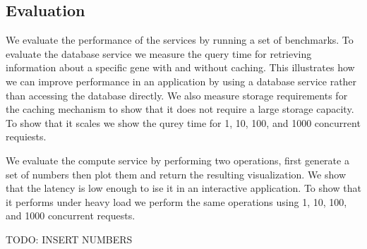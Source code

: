 \subsection*{Evaluation} 
We evaluate the performance of the services by running a set of benchmarks. To
evaluate the database service we measure the query time for retrieving
information about a specific gene with and without caching. This illustrates how
we can improve performance in an application by using a database service rather
than accessing the database directly. We also measure storage requirements for
the caching mechanism to show that it does not require a large storage capacity.
To show that it scales we show the qurey time for 1, 10, 100, and 1000
concurrent requiests.

We evaluate the compute service by performing two operations, first generate a
set of numbers then plot them and return the resulting visualization. We show
that the latency is low enough to ise it in an interactive application. To show
that it performs under heavy load we perform the same operations using 1, 10,
100, and 1000 concurrent requests. 

TODO: INSERT NUMBERS
